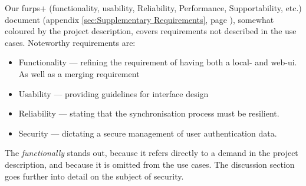 Our furps+ (functionality, usability, Reliability, Performance, Supportability, etc.) document (appendix \ref{sec:Supplementary Requirements}, page \pageref{sec:Supplementary Requirements}), somewhat coloured by the project description, covers requirements not described in the use cases. 
Noteworthy requirements are: 
\begin{itemize}
\item Functionality --- refining the requirement of having both a local- and web-ui. As well as a merging requirement
\item Usability --- providing guidelines for interface design
\item Reliability --- stating that the synchronisation process must be resilient.
\item Security --- dictating a secure management of user authentication data.
\end{itemize}
The \emph{functionally} stands out, because it refers directly to a demand in the project description, and because it is omitted from the use cases.
The discussion section goes further into detail on the subject of security.

